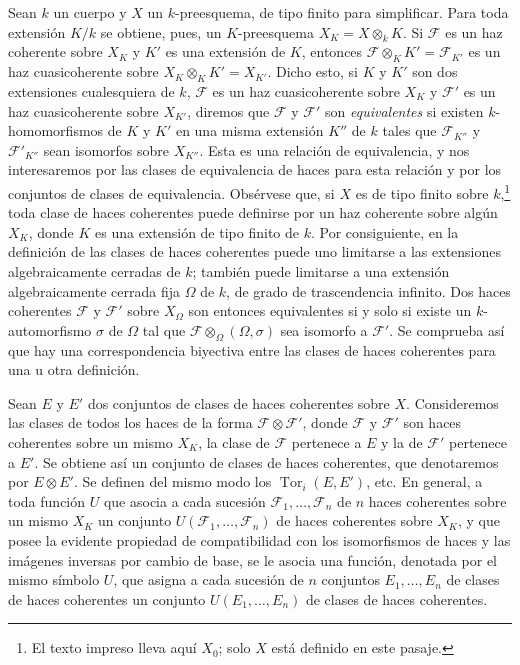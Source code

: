 Sean $k$ un cuerpo y $X$ un $k$-preesquema, de tipo finito para simplificar.
Para toda extensión $K/k$ se obtiene, pues, un $K$-preesquema
$X_K=X\otimes_k K$. Si $\mathcal F$ es un haz coherente sobre $X_K$ y $K'$ es
una extensión de $K$, entonces $\mathcal F\otimes_K K'=\mathcal F_{K'}$ es un
haz cuasicoherente sobre $X_K\otimes_K K'=X_{K'}$. Dicho esto, si $K$ y $K'$
son dos extensiones cualesquiera de $k$, $\mathcal F$ es un haz cuasicoherente
sobre $X_K$ y $\mathcal F'$
es un haz cuasicoherente sobre $X_{K'}$, diremos que $\mathcal F$ y
$\mathcal F'$ son \emph{equivalentes} si existen $k$-homomorfismos de $K$ y
$K'$ en una misma extensión $K''$ de $k$ tales que $\mathcal F_{K''}$ y
$\mathcal F'_{K''}$ sean isomorfos sobre $X_{K''}$. Esta es una relación de
equivalencia, y nos interesaremos por las clases de equivalencia de haces para
esta relación y por los conjuntos de clases de equivalencia. Obsérvese que, si
$X$ es de tipo finito sobre $k$,\footnote{El texto impreso lleva aquí $X_0$;
solo $X$ está definido en este pasaje.} toda clase de haces coherentes puede
definirse por un haz coherente sobre algún $X_K$, donde $K$ es una extensión
de tipo finito de $k$. Por consiguiente, en la definición de las clases de
haces coherentes puede uno limitarse a las extensiones algebraicamente cerradas
de $k$; también puede limitarse a una extensión algebraicamente cerrada fija
$\Omega$ de $k$, de grado de trascendencia infinito. Dos haces coherentes
$\mathcal F$ y $\mathcal F'$ sobre $X_\Omega$ son entonces equivalentes si y
solo si existe un $k$-automorfismo $\sigma$ de $\Omega$ tal que
$\mathcal F\otimes_\Omega(\Omega,\sigma)$ sea isomorfo a $\mathcal F'$.
Se comprueba así que hay una correspondencia biyectiva entre las clases de
haces coherentes para una u otra definición.

Sean $E$ y $E'$ dos conjuntos de clases de haces coherentes sobre $X$.
Consideremos las clases de todos los haces de la forma
$\mathcal F\otimes\mathcal F'$, donde $\mathcal F$ y $\mathcal F'$ son haces
coherentes sobre un mismo $X_K$, la clase de $\mathcal F$ pertenece a $E$ y la
de $\mathcal F'$ pertenece a $E'$. Se obtiene así un conjunto de clases de
haces coherentes, que denotaremos por $E\otimes E'$. Se definen del mismo modo
los $\operatorname{Tor}_i(E,E')$, etc. En general, a toda función $U$ que
asocia a cada sucesión $\mathcal F_1,\ldots,\mathcal F_n$ de $n$ haces
coherentes sobre un mismo $X_K$ un conjunto
$U(\mathcal F_1,\ldots,\mathcal F_n)$ de haces coherentes sobre $X_K$, y que
posee la evidente propiedad de compatibilidad con los isomorfismos de haces y
las imágenes inversas por cambio de base, se le asocia una función, denotada
por el mismo símbolo $U$, que asigna a cada sucesión de $n$ conjuntos
$E_1,\ldots,E_n$ de clases de haces coherentes un conjunto
$U(E_1,\ldots,E_n)$ de clases de haces coherentes.


